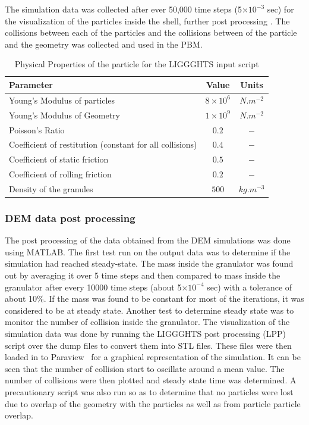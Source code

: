 \documentclass[preprint,11pt,authoryear]{elsarticle}
\begin{document}
The simulation data was collected after ever 50,000 time steps (5$\times 10^{-3}$ sec) 
for the visualization of the particles inside the shell, further post processing . The collisions 
between each of the particles and the collisions between of the particle and the geometry was 
collected and used in the PBM. 

\begin{table}[!htb]%
\caption{Physical Properties of the particle for the LIGGGHTS input script} 
\label{table:mthds_dem_input}
\begin{center}
\begin{tabular}{l|c|c}
\hline
\bf{Parameter} &\bf{Value} &\bf{Units}\\
\hline
Young's Modulus of particles  & $8 \times 10^{6}$ & $N.m^{-2}$\\
Young's Modulus of Geometry  & $1 \times 10^{9}$ & $N.m^{-2}$\\
Poisson's Ratio & $0.2$ & $-$\\
Coefficient of restitution (constant for all collisions) & $0.4$ & $-$\\
Coefficient of static friction & $0.5$ & $-$\\
Coefficient of rolling friction  & $0.2$ & $-$\\
Density of the granules & $500$ & $kg.m^{-3}$\\
\hline
\end{tabular}
\end{center}
\end{table}

\subsubsection{DEM data post processing}
The post processing of the data obtained from the DEM simulations was done using MATLAB. 
The first test run on the output data was to determine if the simulation had reached steady-state. The 
mass inside the granulator was found out by averaging it over 5 time steps and then compared to 
mass inside the granulator after every 10000 time steps (about 5$\times 10^{-4}$ sec) with a 
tolerance of about 10\%. If the mass was found to be constant for most of the iterations, it was 
considered to be at steady state. Another test to determine steady state was to monitor the number of 
collision inside the granulator. The visualization of the simulation data was done by running the 
LIGGGHTS post processing (LPP) script over the dump files to convert them into STL files. These 
files were then loaded in to Paraview~\citep{henderson2004} for a graphical representation of the 
simulation. It can be seen that the number of collision start to oscillate around a mean value. The 
number of collisions were then plotted and steady state time was determined.
A precautionary script was also run so as to determine that no particles were lost due to overlap 
of the geometry with the particles as well as from particle particle overlap.
\end{document}
